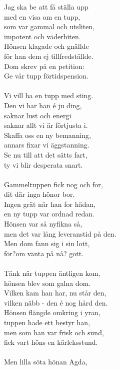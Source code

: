 \vspace{10pt}
Jag ska be att få ställa upp\\
med en visa om en tupp,\\
som var gammal och utsliten,\\
impotent och väderbiten.\\
Hönsen klagade och gnällde\\
för han dem ej tillfredställde.\\
Dom skrev på en petition:\\
Ge vår tupp förtidspension.\\
\\
Vi vill ha en tupp med sting.\\
Den vi har han é ju ding,\\
saknar lust och energi\\
saknar allt vi är förtjusta i.\\
Skaffa oss en ny bemanning,\\
annars fixar vi äggstanning.\\
Se nu till att det sätts fart,\\
ty vi blir desperata snart.\\
\\
Gammeltuppen fick nog och for,\\
dit där inga hönor bor.\\
Ingen grät när han for hädan,\\
en ny tupp var ordnad redan.\\
Hönsen var så nyfikna så,\\
men det var lång leveranstid på den.\\
Men dom fann sig i sin lott,\\
för?om vänta på nå? gott.\\
\\
Tänk när tuppen äntligen kom,\\
hönsen blev som galna dom.\\
Vilken kam han har, nu står den,\\
vilken näbb - den é nog hård den.\\
Hönsen flängde omkring i yran,\\
tuppen hade ett bestyr han,\\
men som han var frisk och sund,\\
fick vart höns en kärleksstund.\\
\\
Men lilla söta hönan Agda,\\
